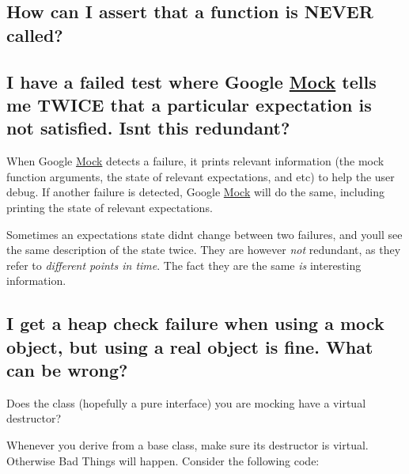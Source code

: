 \subsection*{How can I assert that a function is N\+E\+V\+ER called?}


\begin{DoxyCode}{0}
\end{DoxyCode}


\subsection*{I have a failed test where Google \mbox{\hyperlink{class_mock}{Mock}} tells me T\+W\+I\+CE that a particular expectation is not satisfied. Isn\textquotesingle{}t this redundant?}

When Google \mbox{\hyperlink{class_mock}{Mock}} detects a failure, it prints relevant information (the mock function arguments, the state of relevant expectations, and etc) to help the user debug. If another failure is detected, Google \mbox{\hyperlink{class_mock}{Mock}} will do the same, including printing the state of relevant expectations.

Sometimes an expectation\textquotesingle{}s state didn\textquotesingle{}t change between two failures, and you\textquotesingle{}ll see the same description of the state twice. They are however {\itshape not} redundant, as they refer to {\itshape different points in time}. The fact they are the same {\itshape is} interesting information.

\subsection*{I get a heap check failure when using a mock object, but using a real object is fine. What can be wrong?}

Does the class (hopefully a pure interface) you are mocking have a virtual destructor?

Whenever you derive from a base class, make sure its destructor is virtual. Otherwise Bad Things will happen. Consider the following code\+:


